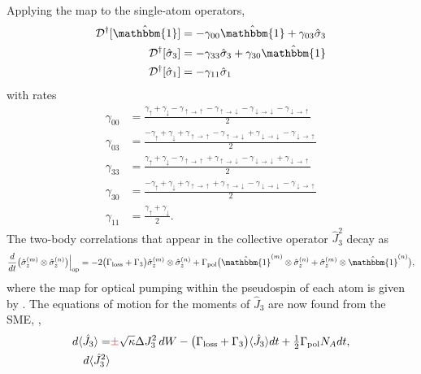 \documentclass[preprint,aps,pra,onecolumn]{revtex4-1} %
\newcommand{\varz}{\Delta J_3^2}
\newcommand{\jz}{\hat{J}_3}
\newcommand{\gammauu}{\gamma_{\uparrow \rightarrow \uparrow}}
\newcommand{\gammadd}{\gamma_{\downarrow \rightarrow \downarrow}}
\newcommand{\gammaud}{\gamma_{\uparrow \rightarrow \downarrow}}
\newcommand{\gammadu}{\gamma_{\downarrow \rightarrow \uparrow}}
\newcommand{\lrate}{\Gamma_{\rm loss}}
\newcommand{\prate}{\Gamma_{\rm pol}}
\newcommand{\zrateA}{\tilde{\Gamma}}
\newcommand{\zrateB}{\Gamma_{?}}
\newcommand{\zrate}{\Gamma_{3}}
\newcommand{\error}[1]{{\color{red} #1}}
\begin{document}
\begin{appendix}
Applying the map to the single-atom operators, 
	\begin{align}
		\mathcal{D}\dg[\hat{\mathbbm{1}}] & = - \gamma_{00} \hat{\mathbbm{1}} +\gamma_{03} \hat{\sigma}_3 \label {Eq::Idecay} \\
		\mathcal{D}\dg[\hat{\sigma}_3] & =- \gamma_{33} \hat{\sigma}_3 +  \gamma_{30} \hat{\mathbbm{1}} 
\label{Eq::zdecay} \\
		\mathcal{D}\dg[\hat{\sigma}_1] & = - \gamma_{11} \hat{\sigma}_1
	\end{align}
with rates	
	\begin{align}
		\gamma_{00} 
			& = \frac{\gamma_{\uparrow}+\gamma_{\downarrow} - \gammauu-\gammaud  -\gammadd-\gammadu}{2} \\
			\gamma_{03} 
			& = \frac{-\gamma_{\uparrow}+\gamma_{\downarrow} +\gammauu-\gammaud +\gammadd-\gammadu }{2}\\		
		\gamma_{33} 
			& = \frac{\gamma_{\uparrow}+\gamma_{\downarrow} - \gammauu+\gammaud  -\gammadd+\gammadu}{2}\\
			\gamma_{30} 
			& = \frac{-\gamma_{\uparrow}+\gamma_{\downarrow} +\gammauu+\gammaud -\gammadd-\gammadu }{2} \\
			\gamma_{11} 
			& = \frac{\gamma_{\uparrow}+\gamma_{\downarrow}}{2}. \label{Eq::frate}
	\end{align}
The two-body correlations that appear in the collective operator $\jz^2$ decay as
	\begin{align}
		\frac{d}{dt} \big(\hat{\sigma}_z^{(m)} \otimes \hat{\sigma}_z^{(n)} \big)  \Big|_{\rm op} = - 2 \big( \lrate + \zrate \big)  \hat{\sigma}_z^{(m)} \otimes \hat{\sigma}_z^{(n)} + \prate \big(\hat{\mathbbm{1}}^{(m)} \otimes \hat{\sigma}_z^{(n)} + \hat{\sigma}_z^{(m)} \otimes \hat{\mathbbm{1}}^{(n)}\big),
	\end{align}
where the map for optical pumping within the pseudospin of each atom is given by .  
The equations of motion for the moments of $\jz$ are now found from the SME, , 
	\begin{subequations} \label{Eq::J3MomentEquations}
	\begin{align} 
		d \expt{\jz} =& \error{\pm} \sqrt{\kappa} \varz \, dW - \big( \lrate + \zrate \big) \expt{\jz}dt + \smallfrac{1}{2} \prate N_A dt ,  \\
		d \expt{\jz^2} %

\end{align}
\end{subequations}
\end{appendix}
\end{document}
